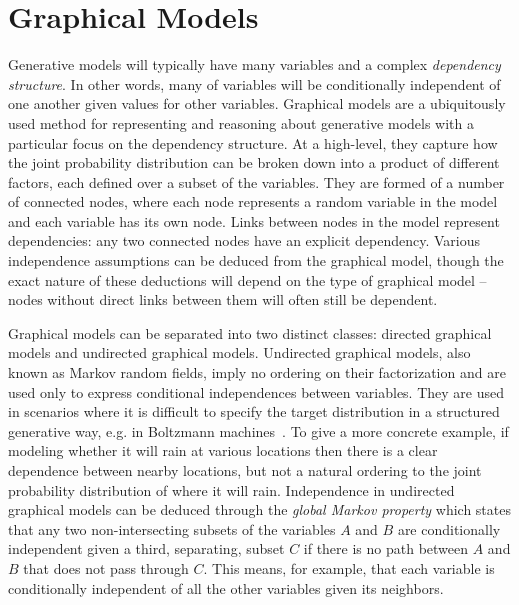 
\section{Graphical Models}
\label{sec:bayes:paradigm:graph}

Generative models will typically have many variables and a complex \emph{dependency structure}.
In other words, many of variables will be conditionally independent of one another given values for
other variables.  Graphical models are a ubiquitously used method for representing and reasoning
about generative models with a particular focus on the dependency structure.  At a high-level, they
capture how the joint probability distribution can be broken down into a product of different factors, 
each defined over
a subset of the variables.  They are formed of a number of connected nodes, where each node
represents a random variable in the model and each variable has its own node.  Links between nodes in
the model represent dependencies: any two connected nodes have an explicit dependency.
Various independence assumptions can be deduced from the graphical model, though the exact nature
of these deductions will depend on the type of graphical model -- nodes without direct links
between them will often still be dependent.

Graphical models can be separated into two distinct classes: directed graphical
models and undirected graphical models.  Undirected graphical models, also known as Markov random
fields, imply no ordering on their factorization and are used only to express conditional independences
between variables.  They are used in scenarios where it is difficult to specify the target distribution in a
structured generative way, e.g. in Boltzmann machines~\citep{ackley1985learning}.  To give 
a more concrete example, if modeling whether it will rain at various locations then there
is a clear dependence between nearby locations, but not a natural ordering to the joint probability
distribution of where it will rain.   Independence in undirected graphical models can be deduced
through the \emph{global Markov property} which states that any two non-intersecting subsets of the 
variables $A$ and $B$ are
conditionally independent given a third, separating, subset $C$ if there is no path between $A$ and
$B$ that does not pass through $C$.  This means, for example, that each variable is conditionally
independent of all the other variables given its neighbors.

